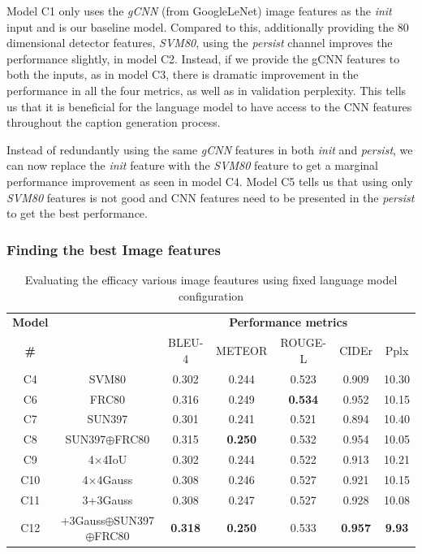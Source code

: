 Model C1 only uses the \emph{gCNN} (from GoogleLeNet) image features as the
\emph{init} input and is our baseline model.
Compared to this, additionally providing the 80 dimensional detector features,
\emph{SVM80},
using the \emph{persist} channel improves the performance slightly, in model C2.
Instead, if we provide the gCNN features to both the inputs, as in model C3,
there is dramatic improvement in the performance in all the four metrics, as
well as in validation perplexity.
This tells us that it is beneficial for the language model to have access to the
CNN features throughout the caption generation process.

Instead of redundantly using the same \emph{gCNN} features in both \emph{init} and
\emph{persist}, we can now replace the \emph{init} feature with the \emph{SVM80}
feature to get a marginal performance improvement as seen in model C4.
Model C5 tells us that using only \emph{SVM80} features is not good and CNN
features need to be presented in the \emph{persist} to get the best performance. 

\subsubsection{Finding the best Image features}
\begin{table}[htp]
  \centering
  \newcommand{\bs}{\small}
  \begin{adjustbox}{center}
  \begin{tabular}{|c|c|c|c|c|c|c|}
    \hline
    \bf Model & \bf \multirow{2}{*}{Init feature} & \multicolumn{5}{c|}{\bf Performance metrics}\\
    \cline{3-7}
    \bf \# &\bf &\bs BLEU-4 &\bs METEOR &\bs ROUGE-L &\bs CIDEr&\bs Pplx \\\hline
    C4 & SVM80               & 0.302 & 0.244 & 0.523 & 0.909 & 10.30  \\
    C6 & FRC80               & 0.316 & 0.249 &\bf0.534 & 0.952 & 10.15  \\
    C7 & SUN397              & 0.301 & 0.241 & 0.521 & 0.894 & 10.40  \\
    C8 & SUN397$\oplus$FRC80 & 0.315 &\bf0.250 & 0.532 &0.954 &10.05  \\\hline
    C9 & 4$\times$4IoU       & 0.302 & 0.244 & 0.522 & 0.913 & 10.21  \\
    C10 & 4$\times$4Gauss    & 0.308 & 0.246 & 0.527 & 0.921 & 10.15  \\
    C11 & 3+3Gauss           & 0.308 & 0.247 & 0.527 & 0.928 & 10.08  \\\hline
    C12 &\parbox[c][][c]{4cm}{\smallskip{}+3Gauss$\oplus$SUN397\\$\oplus$FRC80\smallskip} 
                             &\bf0.318&\bf0.250&0.533 &\bf0.957&\bf9.93\\\hline
  \end{tabular}
  \end{adjustbox}
  \caption{ Evaluating the efficacy various image feautures using fixed language model
          configuration}
  \label{tab:resCocFeatExpt}
\end{table}

